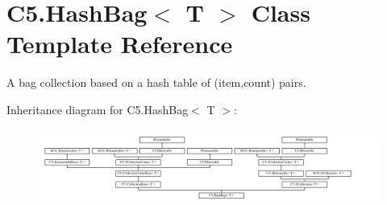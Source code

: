 \hypertarget{class_c5_1_1_hash_bag}{}\section{C5.\+Hash\+Bag$<$ T $>$ Class Template Reference}
\label{class_c5_1_1_hash_bag}


A bag collection based on a hash table of (item,count) pairs.  


Inheritance diagram for C5.\+Hash\+Bag$<$ T $>$\+:\begin{figure}[H]
\begin{center}
\leavevmode
\includegraphics[height=2.526316cm]{class_c5_1_1_hash_bag}
\end{center}
\end{figure}
